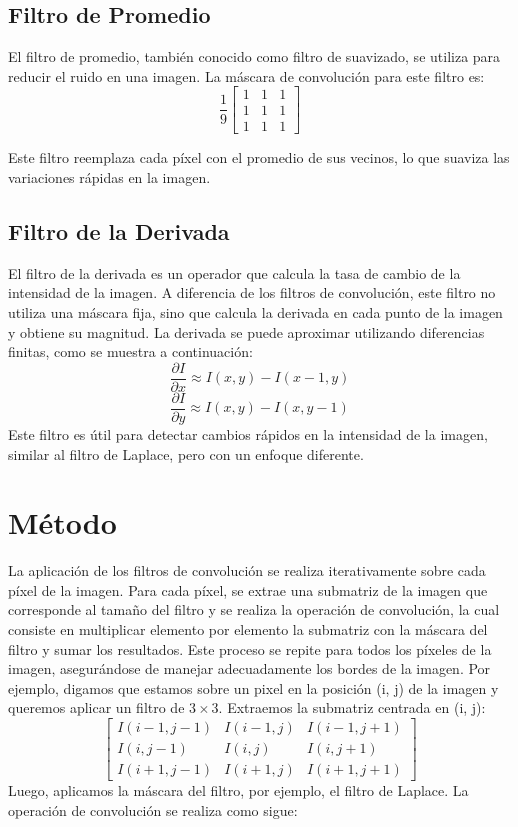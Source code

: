 \documentclass{pas}
\begin{document}
\subsection{Filtro de Promedio}
El filtro de promedio, también conocido como filtro de suavizado, se utiliza para reducir el ruido en una imagen. La máscara de convolución para este filtro es:
\[
\frac{1}{9}
\begin{bmatrix}
1 & 1 & 1 \\
1 & 1 & 1 \\
1 & 1 & 1
\end{bmatrix}
\]

Este filtro reemplaza cada píxel con el promedio de sus vecinos, lo que suaviza las variaciones rápidas en la imagen.

\subsection{Filtro de la Derivada}
El filtro de la derivada es un operador que calcula la tasa de cambio de la intensidad de la imagen. A diferencia de los filtros de convolución, este filtro no utiliza una máscara fija, sino que calcula la derivada en cada punto de la imagen y obtiene su magnitud. La derivada se puede aproximar utilizando diferencias finitas, como se muestra a continuación:
\[\frac{\partial I}{\partial x} \approx I(x, y) - I(x-1, y)\]
\[\frac{\partial I}{\partial y} \approx I(x, y) - I(x, y-1)\]
Este filtro es útil para detectar cambios rápidos en la intensidad de la imagen, similar al filtro de Laplace, pero con un enfoque diferente.


\section{Método}
La aplicación de los filtros de convolución se realiza iterativamente sobre cada píxel de la imagen. Para cada píxel, se extrae una submatriz de la imagen que corresponde al tamaño del filtro y se realiza la operación de convolución, la cual consiste en multiplicar elemento por elemento la submatriz con la máscara del filtro y sumar los resultados. Este proceso se repite para todos los píxeles de la imagen, asegurándose de manejar adecuadamente los bordes de la imagen. Por ejemplo, digamos que estamos sobre un pixel en la posición (i, j) de la imagen y queremos aplicar un filtro de $3 \times 3$. Extraemos la submatriz centrada en (i, j):
\[\begin{bmatrix}
I(i-1, j-1) & I(i-1, j) & I(i-1, j+1) \\
I(i, j-1) & I(i, j) & I(i, j+1) \\
I(i+1, j-1) & I(i+1, j) & I(i+1, j+1)
\end{bmatrix}\]
Luego, aplicamos la máscara del filtro, por ejemplo, el filtro de Laplace. La operación de convolución se realiza como sigue:
\end{document}
